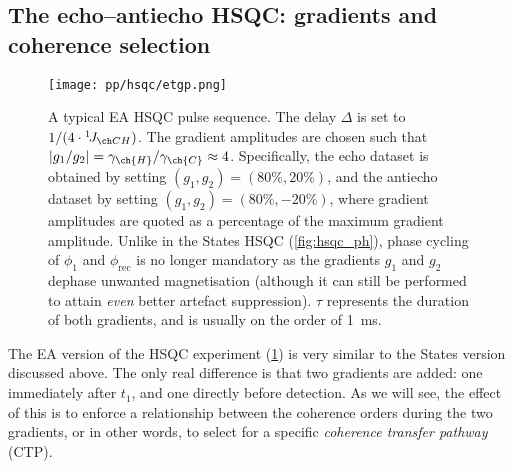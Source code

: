 \subsection{The echo--antiecho HSQC: gradients and coherence selection}
\label{subsec:theory__hsqc_ea}

\begin{figure}[htbp]
    \centering
    \texttt{[image: pp/hsqc/etgp.png]}%
    \caption[Echo--antiecho HSQC pulse sequence]{
        A typical EA HSQC pulse sequence.
        The delay $\Delta$ is set to $1/(4 \cdot \oneJ{CH})$.
        The gradient amplitudes are chosen such that $|g_1/g_2| = \gamma_{\ch{H}}/\gamma_{\ch{C}} \approx 4$.
        Specifically, the echo dataset is obtained by setting $(g_1, g_2) = (80\%, 20\%)$, and the antiecho dataset by setting $(g_1, g_2) = (80\%, -20\%)$, where gradient amplitudes are quoted as a percentage of the maximum gradient amplitude.
        Unlike in the States HSQC (\cref{fig:hsqc_ph}), phase cycling of $\phi_1$ and $\phi_\text{rec}$ is no longer mandatory as the gradients $g_1$ and $g_2$ dephase unwanted magnetisation (although it can still be performed to attain \textit{even} better artefact suppression).
        $\tau$ represents the duration of both gradients, and is usually on the order of \qty{1}{ms}.
    }
    \label{fig:hsqc_etgp}
\end{figure}

The EA version of the HSQC experiment (\cref{fig:hsqc_etgp}) is very similar to the States version discussed above.
The only real difference is that two gradients are added: one immediately after $t_1$, and one directly before detection.
As we will see, the effect of this is to enforce a relationship between the coherence orders during the two gradients, or in other words, to select for a specific \textit{coherence transfer pathway} (CTP).

